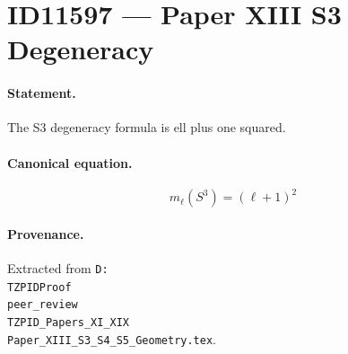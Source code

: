\section*{ID11597 --- Paper XIII S3 Degeneracy}

\paragraph{Statement.}
The S3 degeneracy formula is ell plus one squared.

\paragraph{Canonical equation.}
\[
m_\ell(S^3)=(\ell+1)^2
\]

\paragraph{Provenance.}
Extracted from \texttt{D:\\TZPIDProof\\peer\_review\\TZPID\_Papers\_XI\_XIX\\Paper\_XIII\_S3\_S4\_S5\_Geometry.tex}.
